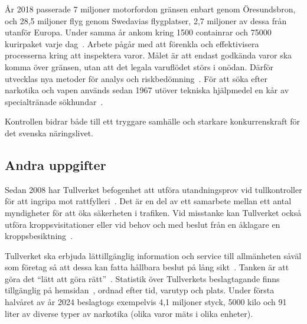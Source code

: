 År 2018 passerade 7 miljoner motorfordon gränsen enbart genom Öresundsbron,
och 28,5 miljoner flyg genom Swedavias flygplatser, 2,7 miljoner av dessa från
utanför Europa. Under samma år ankom kring 1500 containrar och 75000
kurirpaket varje dag~\cite{granskning}.
%
Arbete pågår med att förenkla och effektivisera processerna kring att
inspektera varor. Målet är att endast godkända varor ska komma över gränsen,
utan att det legala varuflödet störs i onödan. Därför utvecklas nya metoder
för analys och riskbedömning~\cite{vision}.
%
För att söka efter narkotika och vapen används sedan 1967 utöver tekniska
hjälpmedel en kår av specialtränade sökhundar~\cite{sokhundar}.

Kontrollen bidrar både till ett tryggare samhälle och starkare konkurrenskraft
för det svenska näringslivet.

\subsection{Andra uppgifter}

Sedan 2008 har Tullverket befogenhet att utföra utandningsprov vid
tullkontroller för att ingripa mot rattfylleri~\cite{rattfylleri}. Det är en
del av ett samarbete mellan ett antal myndigheter för att öka säkerheten
i trafiken.
%
Vid misstanke kan Tullverket också utföra kroppsvisitationer eller vid behov
och med beslut från en åklagare en kroppsbesiktning~\cite{visitation}.

Tullverket ska erbjuda lättillgänglig information och service till
allmänheten såväl som företag så att dessa kan fatta hållbara beslut på
lång sikt~\cite{forordning}. Tanken är att göra det
``lätt att göra rätt''~\cite{vision}.
%
Statistik över Tullverkets beslagtagande finns tillgänglig på
hemsidan~\cite{statistik}, ordnad efter tid, varutyp och plats. Under första
halvåret av år 2024 beslagtogs exempelvis 4,1 miljoner styck, 5000 kilo och 91
liter av diverse typer av narkotika (olika varor mäts i olika enheter).
